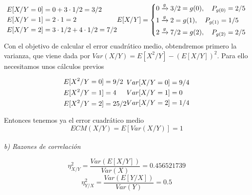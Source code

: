 \documentclass[fleqn]{article}
\begin{document}
    \\
    \begin{equation*}
        \begin{aligned}
            &E[X/Y=0] = 0 + 3 \cdot 1/2 = 3/2\\
            &E[X/Y=1] = 2 \cdot 1  = 2\\
            &E[X/Y=2] = 3\cdot 1/2 + 4 \cdot 1/2 = 7/2\\
        \end{aligned}\\
        E[X/Y]= \left\{
        \begin{aligned}
            &0 \xrightarrow{g} 3/2 = g(0), \quad P_{g(0)} = 2/5 \\
            &1 \xrightarrow{g} 2 = g(1), \quad P_{g(1)} = 1/5 \\
            &2 \xrightarrow{g} 7/2 = g(2), \quad P_{g(2)} = 2/5 \\
        \end{aligned}
        \right.
    \end{equation*}
    Con el objetivo de calcular el error cuadrático medio, obtendremos primero la varianza, que viene dada por 
    $Var(X/Y)=E[X^2/Y] - \left(E[X/Y]\right)^2$. Para ello necesitamos unos cálculos previos

    \begin{equation*}
        \begin{aligned}
            &E[X^2/Y=0] = 9/2\\
            &E[X^2/Y=1] = 4\\
            &E[X^2/Y=2] = 25/2\\
        \end{aligned}\\
        \begin{aligned}
            &Var[X/Y=0] = 9/4\\
            &Var[X/Y=1] = 0\\
            &Var[X/Y=2] = 1/4\\
        \end{aligned}
    \end{equation*}

    Entonces tenemos ya el error cuadrático medio
    $$ECM(X/Y) = E[Var(X/Y)] = 1$$\\

    \textit{b) Razones de correlación}

    $$\eta _{X/Y}^2 = \frac{Var(E[X/Y])}{Var(X)} = 0.456521739$$
    $$\eta _{Y/X}^2 = \frac{Var(E[Y/X])}{Var(Y)} = 0.5$$
\end{document}
